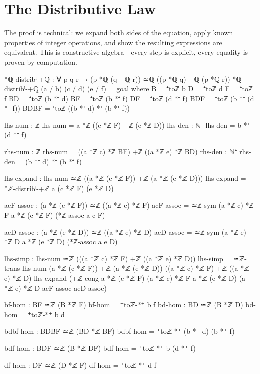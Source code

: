 \documentclass[11pt,a4paper]{book}
\begin{document}
\section{The Distributive Law}

The proof is technical: we expand both sides of the equation, apply known properties of integer operations, and show the resulting expressions are equivalent.
This is constructive algebra---every step is explicit, every equality is proven by computation.

\begin{code}
*ℚ-distribˡ-+ℚ : ∀ p q r → (p *ℚ (q +ℚ r)) ≃ℚ ((p *ℚ q) +ℚ (p *ℚ r))
*ℚ-distribˡ-+ℚ (a / b) (c / d) (e / f) = goal
  where
    B = ⁺toℤ b
    D = ⁺toℤ d
    F = ⁺toℤ f
    BD = ⁺toℤ (b *⁺ d)
    BF = ⁺toℤ (b *⁺ f)
    DF = ⁺toℤ (d *⁺ f)
    BDF = ⁺toℤ (b *⁺ (d *⁺ f))
    BDBF = ⁺toℤ ((b *⁺ d) *⁺ (b *⁺ f))
    
    lhs-num : ℤ
    lhs-num = a *ℤ ((c *ℤ F) +ℤ (e *ℤ D))
    lhs-den : ℕ⁺
    lhs-den = b *⁺ (d *⁺ f)
    
    rhs-num : ℤ
    rhs-num = ((a *ℤ c) *ℤ BF) +ℤ ((a *ℤ e) *ℤ BD)
    rhs-den : ℕ⁺
    rhs-den = (b *⁺ d) *⁺ (b *⁺ f)

    lhs-expand : lhs-num ≃ℤ ((a *ℤ (c *ℤ F)) +ℤ (a *ℤ (e *ℤ D)))
    lhs-expand = *ℤ-distribˡ-+ℤ a (c *ℤ F) (e *ℤ D)

    acF-assoc : (a *ℤ (c *ℤ F)) ≃ℤ ((a *ℤ c) *ℤ F)
    acF-assoc = ≃ℤ-sym {(a *ℤ c) *ℤ F} {a *ℤ (c *ℤ F)} (*ℤ-assoc a c F)
    
    aeD-assoc : (a *ℤ (e *ℤ D)) ≃ℤ ((a *ℤ e) *ℤ D)
    aeD-assoc = ≃ℤ-sym {(a *ℤ e) *ℤ D} {a *ℤ (e *ℤ D)} (*ℤ-assoc a e D)

    lhs-simp : lhs-num ≃ℤ (((a *ℤ c) *ℤ F) +ℤ ((a *ℤ e) *ℤ D))
    lhs-simp = ≃ℤ-trans {lhs-num} {(a *ℤ (c *ℤ F)) +ℤ (a *ℤ (e *ℤ D))} 
                {((a *ℤ c) *ℤ F) +ℤ ((a *ℤ e) *ℤ D)}
                lhs-expand
                (+ℤ-cong {a *ℤ (c *ℤ F)} {(a *ℤ c) *ℤ F} 
                        {a *ℤ (e *ℤ D)} {(a *ℤ e) *ℤ D}
                        acF-assoc aeD-assoc)

    bf-hom : BF ≃ℤ (B *ℤ F)
    bf-hom = ⁺toℤ-*⁺ b f
    bd-hom : BD ≃ℤ (B *ℤ D)
    bd-hom = ⁺toℤ-*⁺ b d

    bdbf-hom : BDBF ≃ℤ (BD *ℤ BF)
    bdbf-hom = ⁺toℤ-*⁺ (b *⁺ d) (b *⁺ f)
    
    bdf-hom : BDF ≃ℤ (B *ℤ DF)
    bdf-hom = ⁺toℤ-*⁺ b (d *⁺ f)

    df-hom : DF ≃ℤ (D *ℤ F)
    df-hom = ⁺toℤ-*⁺ d f


\end{code}
\end{document}
